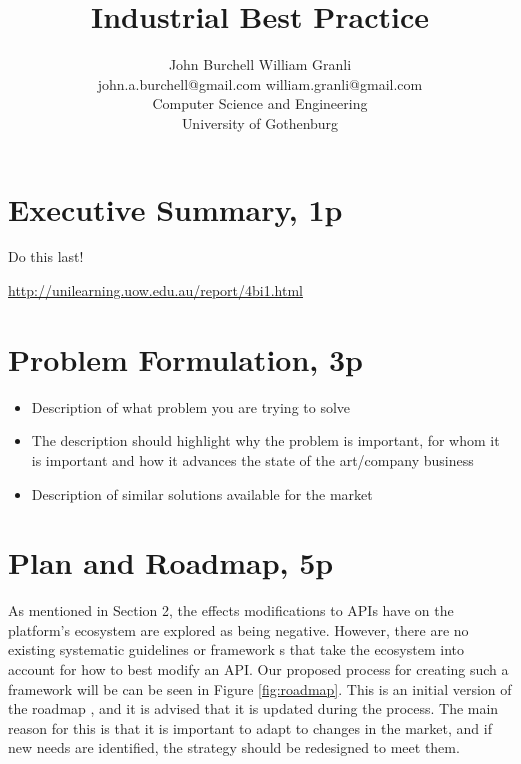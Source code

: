 \documentclass{article}
\title{Industrial Best Practice}
\begin{document}
\author{John Burchell \qquad William Granli \\
		john.a.burchell@gmail.com \qquad william.granli@gmail.com \\
		Computer Science and Engineering  \\
		University of Gothenburg }



\maketitle
\section{Executive Summary, 1p}
Do this last! 

\url{http://unilearning.uow.edu.au/report/4bi1.html}

\section{Problem Formulation, 3p}

\begin{itemize}
	\item Description of what problem you are trying to solve
	\item The description should highlight why the problem is important, for whom it is important and how it advances the state of the art/company business
	\item Description of similar solutions available for the market
\end{itemize}





\section{Plan and Roadmap, 5p}
As mentioned in Section 2, the effects modifications to APIs have on the platform’s ecosystem are explored as being negative. However, there are no existing systematic guidelines or framework s that take the ecosystem into account for how to best modify an API. Our proposed process for creating such a framework will be can be seen in Figure \ref{fig:roadmap}. This is an initial version of the roadmap \cite{!!!roadmap}, and it is advised that it is updated during the process. The main reason for this is that it is important to adapt to changes in the market, and if new needs are identified, the strategy should be redesigned to meet them. 
\end{document}
